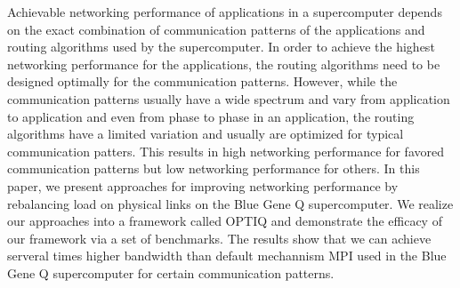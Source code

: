 Achievable networking performance of applications in a supercomputer depends on the exact combination of communication patterns of the applications and routing algorithms used by the supercomputer. In order to achieve the highest networking performance for the applications, the routing algorithms need to be designed optimally for the communication patterns. However, while the communication patterns usually have a wide spectrum and vary from application to application and even from phase to phase in an application, the routing algorithms have a limited variation and usually are optimized for typical communication patters. This results in high networking performance for favored communication patterns but low networking performance for others. In this paper, we present approaches for improving networking performance by rebalancing load on physical links on the Blue Gene Q supercomputer. We realize our approaches into a framework called OPTIQ and demonstrate the efficacy of our framework via a set of benchmarks. The results show that we can achieve serveral times higher bandwidth than default mechannism MPI used in the Blue Gene Q supercomputer for certain communication patterns.

